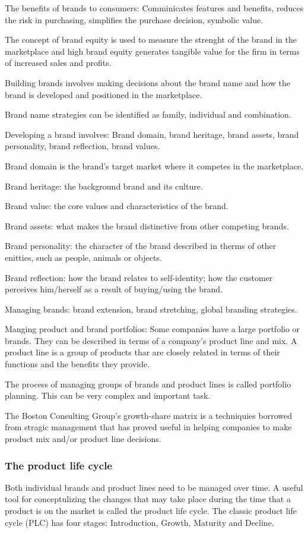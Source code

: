\documentclass{article}
\begin{document}
The benefits of brands to consumers: Comminicates features and benefits, reduces the risk in purchasing, simplifies the purchase decision, symbolic value. 

The concept of brand equity is used to measure the strenght of the brand in the marketplace and high brand equity generates tangible value for the firm in terms of increased sales and profits.

Building brands involves making decisions about the brand name and how the brand is developed and positioned in the marketplace.

Brand name strategies can be identified as family, individual and combination.

Developing a brand involves: Brand domain, brand heritage, brand assets, brand personality, brand reflection, brand values. 

Brand domain is the brand's target market where it competes in the marketplace.

Brand heritage: the background brand and its culture.

Brand value: the core values and characteristics of the brand.

Brand assets: what makes the brand distinctive from other competing brands.

Brand personality: the character of the brand described in therms of other enitties, such as people, animals or objects.

Brand reflection: how the brand relates to self-identity; how the customer perceives him/herself as a result of buying/using the brand.

Managing brands: brand extension, brand stretching, global branding strategies.

Manging product and brand portfolios: Some companies have a large portfolio or brands. They can be described in terms of a company's product line and mix. A product line is a group of products thar are closely related in terms of their functions and the benefits they provide.

The process of managing groups of brands and product lines is called portfolio planning. This can be very complex and important task. 

The Boston Consulting Group's growth-share matrix is a techniquies borrowed from stragic management that has proved useful in helping companies to make product mix and/or product line decisions.

\subsubsection{The product life cycle}
Both individual brands and product lines need to be managed over time. A useful tool for conceptulizing the changes that may take place during the time that a product is on the market is called the product life cycle. The classic product life cycle (PLC) has four stages: Introduction, Growth, Maturity and Decline.
\end{document}
